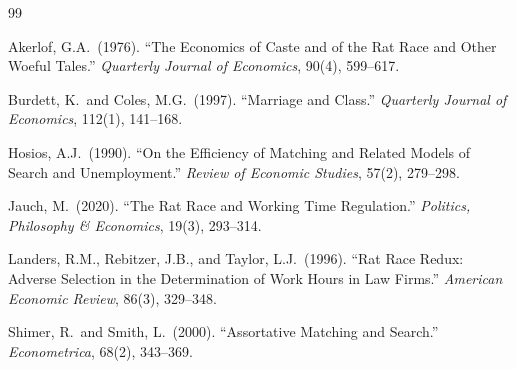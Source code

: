 \documentclass[12pt]{article}
\theoremstyle{plain}
\theoremstyle{definition}
\theoremstyle{remark}
\begin{document}
\begin{thebibliography}{99}

Akerlof, G.A.\ (1976).
``The Economics of Caste and of the Rat Race and Other Woeful Tales.''
\textit{Quarterly Journal of Economics}, 90(4), 599--617.

Burdett, K.\ and Coles, M.G.\ (1997).
``Marriage and Class.''
\textit{Quarterly Journal of Economics}, 112(1), 141--168.

Hosios, A.J.\ (1990).
``On the Efficiency of Matching and Related Models of Search and Unemployment.''
\textit{Review of Economic Studies}, 57(2), 279--298.

Jauch, M.\ (2020).
``The Rat Race and Working Time Regulation.''
\textit{Politics, Philosophy \& Economics}, 19(3), 293--314.

Landers, R.M., Rebitzer, J.B., and Taylor, L.J.\ (1996).
``Rat Race Redux: Adverse Selection in the Determination of Work Hours in Law Firms.''
\textit{American Economic Review}, 86(3), 329--348.

Shimer, R.\ and Smith, L.\ (2000).
``Assortative Matching and Search.''
\textit{Econometrica}, 68(2), 343--369.

\end{thebibliography}
\end{document}
